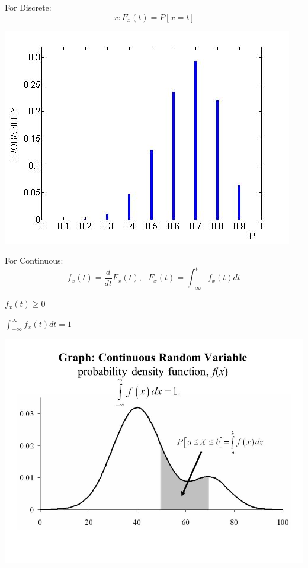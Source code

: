 \documentclass{article}
\begin{document}
{{{            \begin{enumerate}{
                \item For Discrete:
                    \[ x: F_x(t)= P[x= t] \]
                    \begin{center}{
                        \includegraphics[scale=0.3]{dis-pdf.jpg}
                    }
                    \end{center}
                \item For Continuous: 
                    \[ f_x(t) = \frac{d}{dt}F_x(t), \text{ } F_x(t)=\int_{-\infty}^{t}f_x(t)dt \]
                    \begin{enumerate}[i]{
                        \item $f_x(t)\ge 0$
                        \item $\int_{-\infty}^{\infty}f_x(t)dt= 1$
                    }
                    \end{enumerate}

                    \begin{center}{
                        \includegraphics[scale=0.3]{con-pdf.jpg}
                    }
                    \end{center}
            }
            \end{enumerate}  
        }
    }
}
\end{document}
